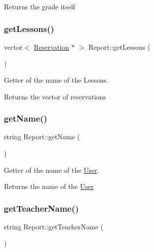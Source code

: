 \begin{DoxyReturn}{Returns}
the grade itself 
\end{DoxyReturn}
\mbox{\label{class_report_a2915547d50dfefb1eae33f12ed0942d8}} 
\subsubsection{\texorpdfstring{get\+Lessons()}{getLessons()}}
{\footnotesize\ttfamily vector$<$ \mbox{\hyperlink{class_reservation}{Reservation}} $\ast$ $>$ Report\+::get\+Lessons (\begin{DoxyParamCaption}{ }\end{DoxyParamCaption})}



Getter of the name of the Lessons. 

\begin{DoxyReturn}{Returns}
the vector of reservations 
\end{DoxyReturn}
\mbox{\label{class_report_aaeac48b6c10c5bbf240fc518b6d45d05}} 
\subsubsection{\texorpdfstring{get\+Name()}{getName()}}
{\footnotesize\ttfamily string Report\+::get\+Name (\begin{DoxyParamCaption}{ }\end{DoxyParamCaption})}



Getter of the name of the \mbox{\hyperlink{class_user}{User}}. 

\begin{DoxyReturn}{Returns}
the name of the \mbox{\hyperlink{class_user}{User}} 
\end{DoxyReturn}
\mbox{\label{class_report_af7c52b70f5fe6feae64e44affa6095cd}} 
\subsubsection{\texorpdfstring{get\+Teacher\+Name()}{getTeacherName()}}
{\footnotesize\ttfamily string Report\+::get\+Teacher\+Name (\begin{DoxyParamCaption}{ }\end{DoxyParamCaption})}



